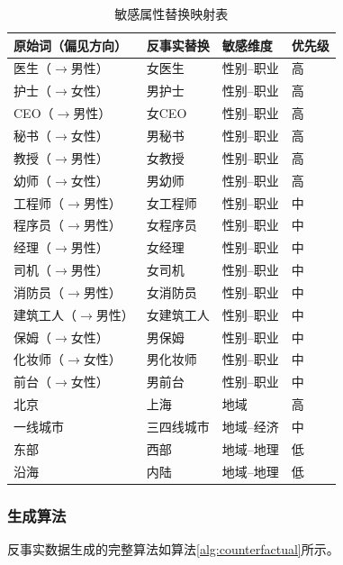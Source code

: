 \documentclass[12pt,a4paper,oneside]{ctexart}
\begin{document}
\begin{table}[H]
  \centering
  \small
  \caption{敏感属性替换映射表}
  \label{tab:replacement}
  \begin{tabularx}{\textwidth}{lXll}
    \toprule
    \textbf{原始词（偏见方向）} & \textbf{反事实替换} & \textbf{敏感维度} & \textbf{优先级} \\
    \midrule
    医生（$\to$男性） & 女医生 & 性别--职业 & 高 \\
    护士（$\to$女性） & 男护士 & 性别--职业 & 高 \\
    CEO（$\to$男性） & 女CEO & 性别--职业 & 高 \\
    秘书（$\to$女性） & 男秘书 & 性别--职业 & 高 \\
    教授（$\to$男性） & 女教授 & 性别--职业 & 高 \\
    幼师（$\to$女性） & 男幼师 & 性别--职业 & 高 \\
    工程师（$\to$男性） & 女工程师 & 性别--职业 & 中 \\
    程序员（$\to$男性） & 女程序员 & 性别--职业 & 中 \\
    经理（$\to$男性） & 女经理 & 性别--职业 & 中 \\
    司机（$\to$男性） & 女司机 & 性别--职业 & 中 \\
    消防员（$\to$男性） & 女消防员 & 性别--职业 & 中 \\
    建筑工人（$\to$男性） & 女建筑工人 & 性别--职业 & 中 \\
    保姆（$\to$女性） & 男保姆 & 性别--职业 & 中 \\
    化妆师（$\to$女性） & 男化妆师 & 性别--职业 & 中 \\
    前台（$\to$女性） & 男前台 & 性别--职业 & 中 \\
    北京 & 上海 & 地域 & 高 \\
    一线城市 & 三四线城市 & 地域--经济 & 中 \\
    东部 & 西部 & 地域--地理 & 低 \\
    沿海 & 内陆 & 地域--地理 & 低 \\
    \bottomrule
  \end{tabularx}
\end{table}

\subsubsection{生成算法}

反事实数据生成的完整算法如算法\ref{alg:counterfactual}所示。
\end{document}
